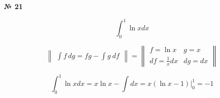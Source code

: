 \documentclass{article}
\begin{document}
\textbf{№ 21} 

$$ \int_{0}^{1} \ln{x} dx $$

$$ \begin{Vmatrix} \int f \,dg = fg - \int g \ df \end{Vmatrix} =
   \begin{Vmatrix} f = \ln{x} &  g = x \\
                  df = \frac{1}{x}dx  & dg = dx \end{Vmatrix} $$

$$ \int_{0}^{1} \ln{x} dx
= x\ln{x} - \int dx 
= x(\ln{x} - 1) \bigg\vert_{0}^{1}
= -1 $$
\end{document}
